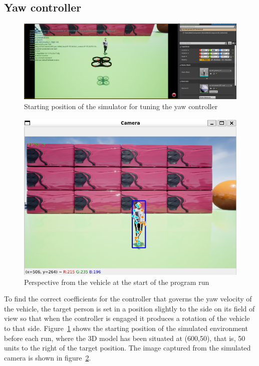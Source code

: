 \subsection{Yaw controller}

\begin{figure}
  \centering
  \includegraphics[width=\textwidth, keepaspectratio]{img/4.1-tune/sim_window_tune.png}
  \caption{Starting position of the simulator for tuning the yaw controller}\label{fig:sim_window_tune}
\end{figure}

\begin{figure}
  \centering
  \includegraphics[width=.5\textwidth, keepaspectratio]{img/4.1-tune/yaw_tune_start_pos.png}
  \caption{Perspective from the vehicle at the start of the program run}\label{fig:sim_camera_tune}
\end{figure}

To find the correct coefficients for the controller that governs the yaw velocity of the vehicle, the target person is set in a position slightly to the side on its field of view so that when the controller is engaged it produces a rotation of the vehicle to that side.
Figure~\ref{fig:sim_window_tune} shows the starting position of the simulated environment before each run, where the 3D model has been situated at (600,50), that is, 50 units to the right of the target position.
The image captured from the simulated camera is shown in figure~\ref{fig:sim_camera_tune}.

